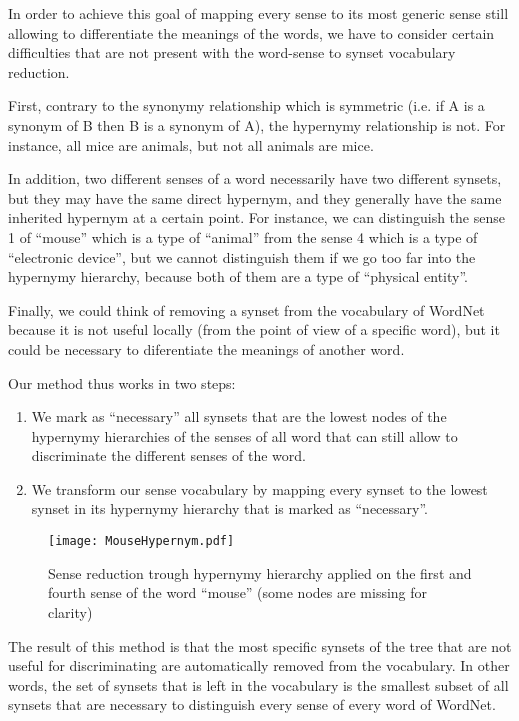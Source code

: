 \documentclass[11pt,a4paper]{article}
\begin{document}
In order to achieve this goal of mapping every sense to its most generic sense still allowing to differentiate the meanings of the words, we have to consider certain difficulties that are not present with the word-sense to synset vocabulary reduction.



First, contrary to the synonymy relationship which is symmetric (i.e. if A is a synonym of B then B is a synonym of A), the hypernymy relationship is not. For instance, all mice are animals, but not all animals are mice.

In addition, two different senses of a word necessarily have two different synsets, but they may have the same direct hypernym, and they generally have the same inherited hypernym at a certain point. For instance, we can distinguish the sense 1 of ``mouse'' which is a type of ``animal'' from the sense 4 which is a type of ``electronic device'', but we cannot distinguish them if we go too far into the hypernymy hierarchy, because both of them are a type of ``physical entity''.

Finally, we could think of removing a synset from the vocabulary of WordNet because it is not useful locally (from the point of view of a specific word), but it could be necessary to diferentiate the meanings of another word. 





Our method thus works in two steps:
\begin{enumerate}
    \item We mark as ``necessary'' all synsets that are the lowest nodes of the hypernymy hierarchies of the senses of all word that can still allow to discriminate the different senses of the word.
    \item We transform our sense vocabulary by mapping every synset to the lowest synset in its hypernymy hierarchy that is marked as ``necessary''. 
\end{enumerate}

\begin{figure}[htbp]
\centering
\texttt{[image: MouseHypernym.pdf]}
\caption{Sense reduction trough hypernymy hierarchy applied on the first and fourth sense of the word ``mouse'' (some nodes are missing for clarity)}
\label{fig:mouse_hypernym}
\end{figure}

The result of this method is that the most specific synsets of the tree that are not useful for discriminating are automatically removed from the vocabulary. In other words, the set of synsets that is left in the vocabulary is the smallest subset of all synsets that are necessary to distinguish every sense of every word of WordNet.
\end{document}
